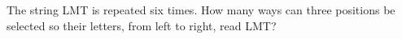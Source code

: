 The string LMT is repeated six times. How many ways can three positions be selected so their letters, from left to right, read LMT?
